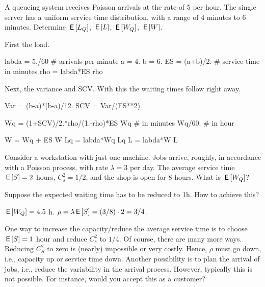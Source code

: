 \begin{exercise}
  A queueing system receives Poisson arrivals at the rate of 5 per
  hour. The single server has a uniform service time distribution,
  with a range of 4 minutes to 6 minutes. Determine $\,\mathsf{E}\left[L_Q\right]$, $\,\mathsf{E}\left[L\right]$,
  $\,\mathsf{E}\left[W_Q\right]$, $\,\mathsf{E}\left[W\right]$.
  \begin{solution}
First the load.
\begin{pyconsole}
labda = 5./60 # arrivals per minute
a = 4.
b = 6.
ES = (a+b)/2.  # service time in minutes
rho = labda*ES
rho
\end{pyconsole}

Next, the variance and SCV. With this the waiting times follow right away.
\begin{pyconsole}
Var = (b-a)*(b-a)/12.
SCV = Var/(ES**2)


Wq = (1+SCV)/2.*rho/(1.-rho)*ES
Wq # in minutes
Wq/60. # in hour


W = Wq + ES
W
Lq = labda*Wq
Lq
L = labda*W
L
\end{pyconsole}
  \end{solution}
\end{exercise}



\begin{exercise}
  Consider a workstation with just one machine. Jobs arrive, roughly,
  in accordance with a Poisson process, with rate $\lambda=3$ per day. The
  average service time $\,\mathsf{E}\left[S\right] = 2$ hours, $C^2_s = 1/2$, and the shop
  is open for 8 hours. What is $\,\mathsf{E}\left[W_Q\right]$?

 Suppose the expected waiting time has to be reduced to 1h. How
  to achieve this? 
\begin{solution}
  $\,\mathsf{E}\left[W_Q\right] = 4.5$ h. $\rho = \lambda \,\mathsf{E}\left[S\right] = (3/8)\cdot 2 = 3/4$.

 One way to increase the capacity/reduce the average service
    time is to choose $\,\mathsf{E}\left[S\right] =1$ hour and reduce $C^2_s$ to $1/4$.  Of
    course, there are many more ways. Reducing $C^2_S$ to zero is
    (nearly) impossible or very costly. Hence, $\rho$ must go down,
    i.e., capacity up or service time down. Another possibility is to
    plan the arrival of jobs, i.e., reduce the variability in the
    arrival process. However, typically this is not possible. For
    instance, would you accept this as a customer?
\end{solution}
\end{exercise}


